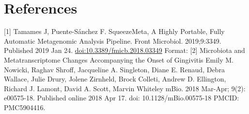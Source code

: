 \documentclass[
]{book}
\begin{document}
\hypertarget{references}{%
\section{References}\label{references}}

{[}1{]} Tamames J, Puente-Sánchez F. SqueezeMeta, A Highly Portable, Fully Automatic Metagenomic Analysis Pipeline. Front
Microbiol. 2019;9:3349. Published 2019 Jan 24. \url{doi:10.3389/fmicb.2018.03349} Format:
{[}2{]} Microbiota and Metatranscriptome Changes Accompanying the Onset of Gingivitis Emily M. Nowicki, Raghav Shroff, Jacqueline
A. Singleton, Diane E. Renaud, Debra Wallace, Julie Drury, Jolene Zirnheld, Brock Colleti, Andrew D. Ellington,
Richard J. Lamont, David A. Scott, Marvin Whiteley mBio. 2018 Mar-Apr; 9(2): e00575-18. Published online 2018 Apr 17.
doi: 10.1128/mBio.00575-18 PMCID: PMC5904416.

  
\end{document}

